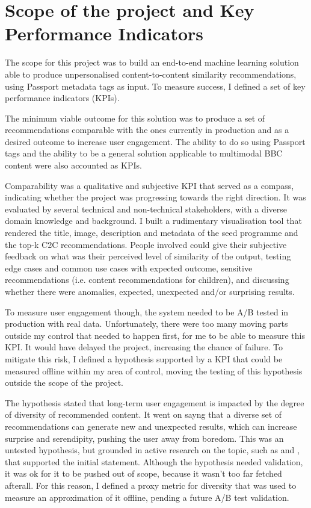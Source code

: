 
\section{Scope of the project and Key Performance Indicators}

The scope for this project was to build an end-to-end machine learning solution able to produce unpersonalised content-to-content
similarity recommendations, using Passport metadata tags as input. To measure success, I defined a set of key performance indicators (KPIs).

The minimum viable outcome for this solution was to produce a set of recommendations comparable with the ones currently in production and
as a desired outcome to increase user engagement. The ability to do so using Passport tags and the ability to
be a general solution applicable to multimodal BBC content were also accounted as KPIs.

Comparability was a qualitative and subjective KPI that served as a compass, indicating whether the project was progressing towards the right direction.
It was evaluated by several technical and non-technical stakeholders, with a diverse domain knowledge and background. I built a rudimentary visualisation
tool that rendered the title, image, description and metadata of the seed programme and the top-k C2C recommendations.
People involved could give their subjective feedback on what was their perceived level of similarity of the output,
testing edge cases and common use cases with expected outcome, sensitive recommendations (i.e. content recommendations for children),
and discussing whether there were anomalies, expected, unexpected and/or surprising results.

To measure user engagement though, the system needed to be A/B tested in production with real data.
Unfortunately, there were too many moving parts outside my control that needed to happen first, for me to be able to measure this KPI.
It would have delayed the project, increasing the chance of failure.
To mitigate this risk, I defined a hypothesis supported by a KPI that could be measured offline within my area of control, moving the
testing of this hypothesis outside the scope of the project.

The hypothesis stated that long-term user engagement is impacted by the degree of diversity of recommended content. It went on sayng that
a diverse set of recommendations can generate new and unexpected results, which can increase surprise and serendipity, pushing the user away from boredom.
This was an untested hypothesis, but grounded in active research on the topic, such as \cite{Kaminskas2016DiversitySN} and
\cite{duricic2023beyondaccuracyreviewdiversityserendipity}, that supported the initial statement. Although the hypothesis needed validation,
it was ok for it to be pushed out of scope, because it wasn't too far fetched afterall.
For this reason, I defined a proxy metric for diversity that was used to measure an approximation of it offline,
pending a future A/B test validation.
